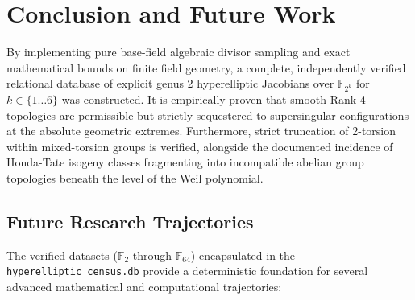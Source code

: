\documentclass[letterpaper, 11pt]{article}
\begin{document}
\section{Conclusion and Future Work}
By implementing pure base-field algebraic divisor sampling and exact mathematical bounds on finite field geometry, a complete, independently verified relational database of explicit genus 2 hyperelliptic Jacobians over $\mathbb{F}_{2^k}$ for $k \in \{1 \dots 6\}$ was constructed. It is empirically proven that smooth Rank-4 topologies are permissible but strictly sequestered to supersingular configurations at the absolute geometric extremes. Furthermore, strict truncation of 2-torsion within mixed-torsion groups is verified, alongside the documented incidence of Honda-Tate isogeny classes fragmenting into incompatible abelian group topologies beneath the level of the Weil polynomial. 

\subsection{Future Research Trajectories}
The verified datasets ($\mathbb{F}_2$ through $\mathbb{F}_{64}$) encapsulated in the \texttt{hyperelliptic\_census.db} provide a deterministic foundation for several advanced mathematical and computational trajectories:
\end{document}
